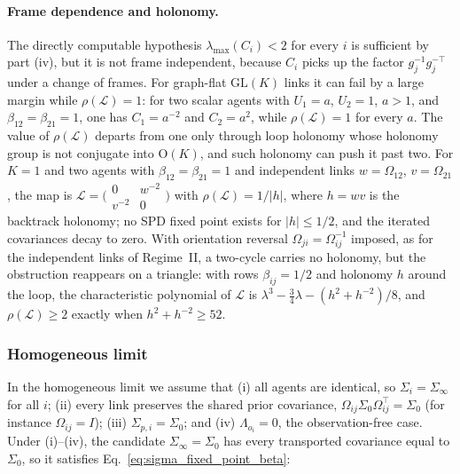 \paragraph{Frame dependence and holonomy.} The directly computable hypothesis $\lambda_{\max}(C_i)<2$ for every $i$ is sufficient by part (iv), but it is not frame independent, because $C_i$ picks up the factor $g_j^{-1}g_j^{-\top}$ under a change of frames. For graph-flat $\mathrm{GL}(K)$ links it can fail by a large margin while $\rho(\mathcal{L}) = 1$: for two scalar agents with $U_1=a$, $U_2=1$, $a>1$, and $\beta_{12}=\beta_{21}=1$, one has $C_1=a^{-2}$ and $C_2=a^2$, while $\rho(\mathcal L)=1$ for every $a$. The value of $\rho(\mathcal{L})$ departs from one only through loop holonomy whose holonomy group is not conjugate into $\mathrm{O}(K)$, and such holonomy can push it past two. For $K = 1$ and two agents with $\beta_{12} = \beta_{21} = 1$ and independent links $w = \Omega_{12}$, $v = \Omega_{21}$, the map is $\mathcal{L} = \bigl(\begin{smallmatrix}0 & w^{-2}\\ v^{-2} & 0\end{smallmatrix}\bigr)$ with $\rho(\mathcal L)=1/|h|$, where $h=wv$ is the backtrack holonomy; no SPD fixed point exists for $|h|\leq1/2$, and the iterated covariances decay to zero. With orientation reversal $\Omega_{ji} = \Omega_{ij}^{-1}$ imposed, as for the independent links of Regime~II, a two-cycle carries no holonomy, but the obstruction reappears on a triangle: with rows $\beta_{ij} = 1/2$ and holonomy $h$ around the loop, the characteristic polynomial of $\mathcal{L}$ is $\lambda^3 - \tfrac{3}{4}\lambda - (h^2 + h^{-2})/8$, and $\rho(\mathcal{L}) \geq 2$ exactly when $h^2 + h^{-2} \geq 52$.

\subsubsection{Homogeneous limit}

In the homogeneous limit we assume that (i) all agents are identical, so $\Sigma_i = \Sigma_\infty$ for all $i$; (ii) every link preserves the shared prior covariance, $\Omega_{ij}\Sigma_0\Omega_{ij}^\top = \Sigma_0$ (for instance $\Omega_{ij} = I$); (iii) $\Sigma_{p,i} = \Sigma_0$; and (iv) $\Lambda_{o_i} = 0$, the observation-free case. Under (i)--(iv), the candidate $\Sigma_\infty=\Sigma_0$ has every transported covariance equal to $\Sigma_0$, so it satisfies Eq.~\eqref{eq:sigma_fixed_point_beta}:

